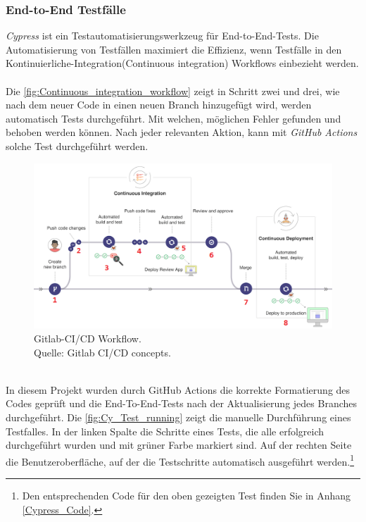 \subsubsection*{End-to-End Testfälle}
\textit{Cypress} ist ein Testautomatisierungswerkzeug für End-to-End-Tests. 
Die Automatisierung von Testfällen maximiert die Effizienz, wenn Testfälle in den Kontinuierliche-Integration(Continuous integration) Workflows einbezieht werden. %
\\\\
Die \autoref{fig:Continuous_integration_workflow} zeigt in Schritt zwei und drei, wie nach dem neuer Code in einen neuen Branch hinzugefügt wird, werden automatisch Tests durchgeführt. Mit welchen, möglichen Fehler gefunden und behoben werden können. Nach jeder relevanten Aktion, kann mit \textit{GitHub Actions} solche Test durchgeführt werden.
\begin{figure}[h!]
	\centering
    \includegraphics[width=\textwidth]{sources/Gitlab-CI.png}
	\caption{Gitlab-CI/CD Workflow. \\
	Quelle: Gitlab CI/CD concepts{\cite{GLAB1}}.}
	\label{fig:Continuous_integration_workflow} 
\end{figure}
\\
In diesem Projekt wurden durch GitHub Actions die korrekte Formatierung des Codes geprüft und die End-To-End-Tests nach der Aktualisierung jedes Branches durchgeführt.
\newpage
Die \autoref{fig:Cy_Test_running} zeigt die manuelle Durchführung eines Testfalles. In der linken Spalte die Schritte eines Tests, die alle erfolgreich durchgeführt wurden und mit grüner Farbe markiert sind. Auf der rechten Seite die Benutzeroberfläche, auf der die Testschritte automatisch ausgeführt werden.\footnote{Den entsprechenden Code für den oben gezeigten Test finden Sie in Anhang \ref{Cypress_Code}.
}
